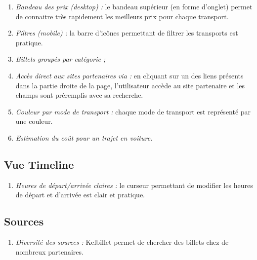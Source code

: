 \begin{enumerate}
\item {\em Bandeau des prix (desktop) : } le bandeau sup\'{e}rieur (en forme d'onglet) permet de connaitre tr\`{e}s rapidement les meilleurs prix pour chaque transport.
\item {\em Filtres (mobile) : } la barre d'ic\^{o}nes permettant de filtrer les transports est pratique.
\item {\em Billets group\'{e}s par cat\'{e}gorie ;}		
\item {\em Acc\`{e}s direct aux sites partenaires via  : } en cliquant sur un des liens pr\'{e}sents dans la partie droite de la page, l'utilisateur acc\`{e}de au site partenaire et les champs sont pr\'{e}remplis avec sa recherche.
\item {\em Couleur par mode de transport : } chaque mode de transport est repr\'{e}sent\'{e} par une couleur.
\item {\em Estimation du co\^{u}t pour un trajet en voiture.}
\end{enumerate}

\subsection{Vue Timeline}
\begin{enumerate}
\item {\em Heures de d\'{e}part/arriv\'{e}e claires : } le curseur permettant de modifier les heures de d\'{e}part et d'arriv\'{e}e est clair et pratique.	
\end{enumerate}


\subsection{Sources}
\begin{enumerate}
\item {\em Diversit\'{e} des sources : } Kelbillet permet de chercher des billets chez de nombreux partenaires.
\end{enumerate}